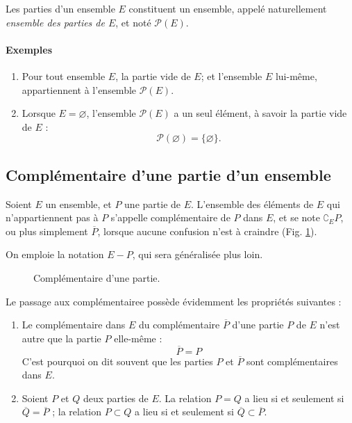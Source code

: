 \documentclass[12pt,parskip=full,chapterprefix=true,a5paper]{scrbook}
\begin{document}
Les parties d'un ensemble \(E\) constituent un ensemble, appelé naturellement \emph{ensemble des parties de \(E\)}, et noté \(\mathcal{P}(E)\).

\paragraph{Exemples}
\begin{enumerate}
\item Pour tout ensemble \(E\), la partie vide de \(E\); et l'ensemble \(E\) lui-même, appartiennent à l'ensemble \(\mathcal{P}(E)\).
\item Lorsque \(E=\varnothing\), l'ensemble \(\mathcal{P}(E)\) a un seul élément, à savoir la partie vide de \(E\) :
  \[
    \mathcal{P}(\varnothing)=\{\varnothing\}.
  \]
\end{enumerate}

\subsection*{Complémentaire d'une partie d'un ensemble}
Soient \(E\) un ensemble, et \(P\) une partie de \(E\). L'ensemble des éléments de \(E\) qui n'appartiennent pas à \(P\) s'appelle complémentaire de \(P\) dans \(E\), et se note \(\complement_EP\), ou plus simplement \(\overline{P}\), lorsque aucune confusion n'est à craindre (Fig. \ref{fig:complementaire}).

On emploie la notation \(E-P\), qui sera généralisée plus loin.

\begin{figure}[ht]
  \centering
  \caption{\label{fig:complementaire}Complémentaire d'une partie.}
\end{figure}

Le passage aux complémentairee possède évidemment les propriétés suivantes :
\begin{enumerate} [label=\alph*)]
\item Le complémentaire dans \(E\) du complémentaire \(\overline{P}\) d'une partie \(P\) de \(E\) n'est autre que la partie \(P\) elle-même :
  \[
    \overline{P}=P
  \]
  C'est pourquoi on dit souvent que les parties \(P\) et \(\overline{P}\) sont complémentaires dans \(E\).
\item Soient \(P\) et \(Q\) deux parties de \(E\). La relation \(P=Q\) a lieu si et seulement si \(\overline{Q}=\overline{P}\) ; la relation \(P\subset Q\) a lieu si et seulement si \(\overline{Q}\subset\overline{P}\).
\end{enumerate}
\end{document}
